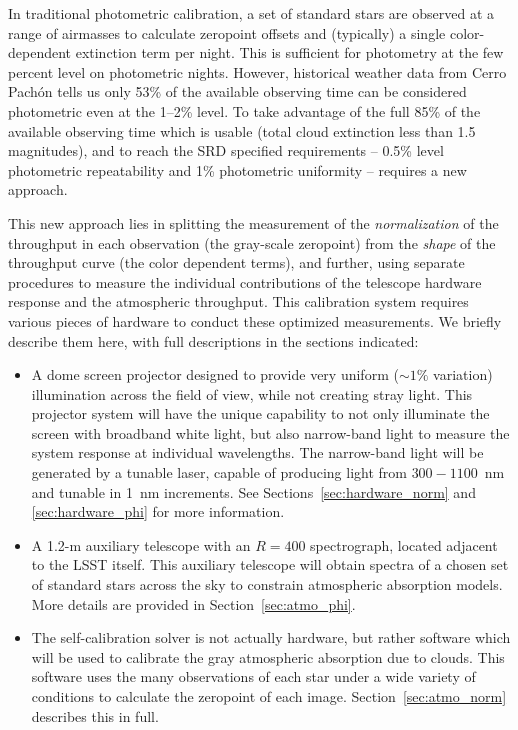 \documentclass[12pt,preprint]{aastex}
\begin{document}
In traditional photometric calibration, a set of standard stars are
observed at a range of airmasses to calculate zeropoint offsets and
(typically) a single color-dependent extinction term per night. This is
sufficient for photometry at the few percent level on photometric
nights. However, historical weather data from Cerro Pach\'{o}n tells us
only 53\% of the available observing time can be considered
photometric even at the 1--2\% level. To take advantage of the full
85\% of the available observing time which is usable (total cloud
extinction less than 1.5 magnitudes), and to reach the SRD specified
requirements -- 0.5\% level photometric repeatability and 1\%
photometric uniformity -- requires a new approach.

This new approach lies in splitting the measurement of the {\it
normalization} of the throughput in each observation (the gray-scale
zeropoint) from the {\it shape} of the throughput curve (the color
dependent terms), and further, using separate procedures to measure
the individual contributions of the telescope hardware response and
the atmospheric throughput. This calibration system requires various
pieces of hardware to conduct these optimized measurements. We briefly
describe them here, with full descriptions in the sections indicated:
\begin{itemize}
\item{A dome screen projector designed to provide very uniform
    ($\sim1\%$ variation) illumination across the field of view, while
    not creating stray light. This projector system will have the unique
    capability to not only illuminate the screen with broadband white
    light, but also narrow-band light to measure the system response
    at individual wavelengths. The narrow-band light will be generated
    by a tunable laser, capable of producing light from $300-1100$~nm
    and tunable in 1~nm increments. See
    Sections~\ref{sec:hardware_norm} and \ref{sec:hardware_phi} for
    more information.}
\item{A 1.2-m auxiliary telescope with an $R=400$ spectrograph,
    located adjacent to the LSST itself. This auxiliary telescope will
    obtain spectra of a chosen set of standard stars across the sky to
    constrain atmospheric absorption models. More details are provided
  in Section~\ref{sec:atmo_phi}.}
\item{The self-calibration solver is not actually hardware, but rather
    software which will be used to calibrate the gray atmospheric
    absorption due to clouds. This software uses the many observations
    of each star under a wide variety of conditions to calculate the
    zeropoint of each image. Section~\ref{sec:atmo_norm} describes
    this in full.}
\end{itemize}
\end{document}
